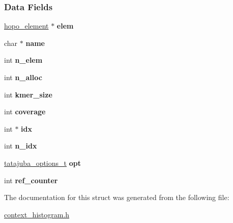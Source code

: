 \subsubsection*{Data Fields}
\begin{DoxyCompactItemize}
\item 
\mbox{\label{structhopo__counter__struct_ab72daf83c1f9fbd42e9fc6f6a5e8f8ee}} 
\hyperlink{structhopo__element}{hopo\+\_\+element} $\ast$ {\bfseries elem}
\item 
\mbox{\label{structhopo__counter__struct_ac93a5ab1f03c2e55b9f659da0a28a13b}} 
char $\ast$ {\bfseries name}
\item 
\mbox{\label{structhopo__counter__struct_a4832bb45f09cd83f3d69f050c6df5146}} 
int {\bfseries n\+\_\+elem}
\item 
\mbox{\label{structhopo__counter__struct_ae17dff06dd59e5f37782c848f29543dd}} 
int {\bfseries n\+\_\+alloc}
\item 
\mbox{\label{structhopo__counter__struct_acd0ac2cffd8871a59ceca4ed57991fad}} 
int {\bfseries kmer\+\_\+size}
\item 
\mbox{\label{structhopo__counter__struct_a51908413e8871158c4f36318d44a97a8}} 
int {\bfseries coverage}
\item 
\mbox{\label{structhopo__counter__struct_a7563723be42376a13e697fbe6355c9ad}} 
int $\ast$ {\bfseries idx}
\item 
\mbox{\label{structhopo__counter__struct_a25287c99ae31763306567523a94f220f}} 
int {\bfseries n\+\_\+idx}
\item 
\mbox{\label{structhopo__counter__struct_a945977ada566dfb60d4d47d01621036d}} 
\hyperlink{structtatajuba__options__t}{tatajuba\+\_\+options\+\_\+t} {\bfseries opt}
\item 
\mbox{\label{structhopo__counter__struct_a89c07bc7b8472144db54e330309145f1}} 
int {\bfseries ref\+\_\+counter}
\end{DoxyCompactItemize}


The documentation for this struct was generated from the following file\+:\begin{DoxyCompactItemize}
\item 
\hyperlink{context__histogram_8h}{context\+\_\+histogram.\+h}\end{DoxyCompactItemize}
